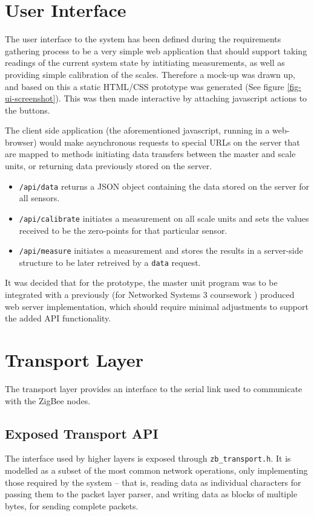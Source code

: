 \section{User Interface}
The user interface to the system has been defined during the requirements gathering process to be a very simple web application that should support taking readings of the current system state by intitiating measurements, as well as providing simple calibration of the scales. Therefore a mock-up was drawn up, and based on this a static HTML/CSS prototype was generated (See figure \ref{fig-ui-screenshot}). This was then made interactive by attaching javascript actions to the buttons.

The client side application (the aforementioned javascript, running in a web-browser) would make asynchronous requests to special URLs on the server that are mapped to methods initiating data transfers between the master and scale units, or returning data previously stored on the server.

\begin{itemize}
	\item \texttt{/api/data} returns a JSON \cite{json-spec} object containing the data stored on the server for all sensors.
	\item \texttt{/api/calibrate} initiates a measurement on all scale units and sets the values received to be the zero-points for that particular sensor.
	\item \texttt{/api/measure} initiates a measurement and stores the results in a server-side structure to be later retreived by a \texttt{data} request.
\end{itemize}

It was decided that for the prototype, the master unit program was to be integrated with a previously (for Networked Systems 3 coursework \cite{ns3-webserver}) produced web server implementation, which should require minimal adjustments to support the added API functionality.

\section{Transport Layer}
The transport layer provides an interface to the serial link used to communicate with the ZigBee nodes.

\subsection{Exposed Transport API}
The interface used by higher layers is exposed through \texttt{zb\_transport.h}. It is modelled as a subset of the most common network operations, only implementing those required by the system -- that is, reading data as individual characters for passing them to the packet layer parser, and writing data as blocks of multiple bytes, for sending complete packets.

